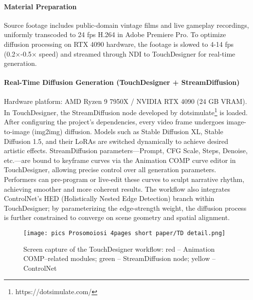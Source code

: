 \documentclass[sigconf,nonacm]{acmart}
\begin{document}
\paragraph{Material Preparation}
Source footage includes public-domain vintage films and live gameplay recordings, uniformly transcoded to 24 fps H.264 in Adobe Premiere Pro. To optimize diffusion processing on RTX 4090 hardware, the footage is slowed to 4-14 fps (0.2×-0.5× speed) and streamed through NDI to TouchDesigner for real-time generation.

\paragraph{Real-Time Diffusion Generation (TouchDesigner + StreamDiffusion)}
Hardware platform: AMD Ryzen 9 7950X / NVIDIA RTX 4090 (24 GB VRAM).
In TouchDesigner, the StreamDiffusion node developed by dotsimulate\footnote{https://dotsimulate.com/} is loaded. After configuring the project's dependencies, every video frame undergoes image-to-image (img2img) diffusion. Models such as Stable Diffusion XL, Stable Diffusion 1.5, and their LoRAs are switched dynamically to achieve desired artistic effects.
StreamDiffusion parameters—Prompt, CFG Scale, Steps, Denoise, etc.—are bound to keyframe curves via the Animation COMP curve editor in TouchDesigner, allowing precise control over all generation parameters. Performers can pre-program or live-edit these curves to sculpt narrative rhythm, achieving smoother and more coherent results.
The workflow also integrates ControlNet's HED (Holistically Nested Edge Detection) branch within TouchDesigner; by parameterizing the edge-strength weight, the diffusion process is further constrained to converge on scene geometry and spatial alignment.
\begin{figure}
    \centering
    \texttt{[image: pics Prosomoiosi 4pages short paper/TD detail.png]}
    \caption{Screen capture of the TouchDesigner workflow: red – Animation COMP–related modules; green – StreamDiffusion node; yellow – ControlNet}
    \label{fig:enter-label}
\end{figure}
\end{document}
